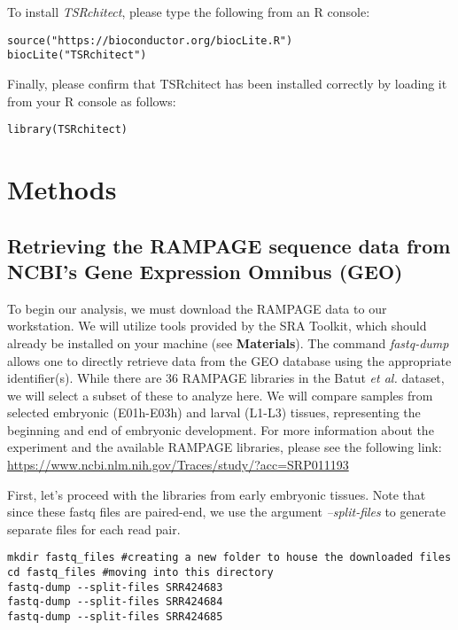 \documentclass[runningheads,a4paper]{llncs}
\begin{document}
\begin{linenumbers}
\begin{itemize}
To install \textit{TSRchitect}, please type the following from an R console:

\begin{lstlisting}
source("https://bioconductor.org/biocLite.R")
biocLite("TSRchitect")
\end{lstlisting}

Finally, please confirm that TSRchitect has been installed correctly by loading it from your R console as follows:

\begin{lstlisting}
library(TSRchitect)
\end{lstlisting}

\section{Methods}

\subsection{Retrieving the RAMPAGE sequence data from NCBI's Gene Expression Omnibus (GEO)}

To begin our analysis, we must download the RAMPAGE data to our workstation. 
We will utilize tools provided by the SRA Toolkit, which should already be installed on your machine (see \textbf{Materials}).
The command \textit{fastq-dump} allows one to directly retrieve data from the GEO database using the appropriate identifier(s).
While there are 36 RAMPAGE libraries in the Batut \textit{et al.} dataset, we will select a subset of these to analyze here.
We will compare samples from selected embryonic (E01h-E03h) and larval (L1-L3) tissues, representing the beginning and end of embryonic development.
For more information about the experiment and the available RAMPAGE libraries, please see the following link: \url{https://www.ncbi.nlm.nih.gov/Traces/study/?acc=SRP011193}

First, let's proceed with the libraries from early embryonic tissues. 
Note that since these fastq files are paired-end, we use the argument \textit{--split-files} to generate separate files for each read pair.

\begin{lstlisting}
mkdir fastq_files #creating a new folder to house the downloaded files
cd fastq_files #moving into this directory
fastq-dump --split-files SRR424683
fastq-dump --split-files SRR424684
fastq-dump --split-files SRR424685
\end{lstlisting}


\end{itemize}
\end{linenumbers}
\end{document}
